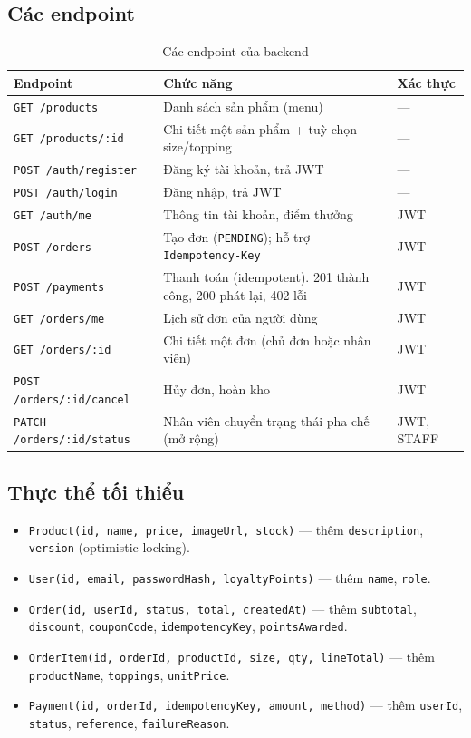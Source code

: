 \documentclass[a4paper]{article}
\newcommand{\st}[1]{\texttt{#1}}
\begin{document}
\subsection{Các endpoint}
\begin{table}[h!]
\centering\small
\begin{tabularx}{\textwidth}{|L{4.1cm}|X|L{1.8cm}|}
\hline
\textbf{Endpoint} & \textbf{Chức năng} & \textbf{Xác thực} \\ \hline
\texttt{GET /products} & Danh sách sản phẩm (menu) & --- \\ \hline
\texttt{GET /products/:id} & Chi tiết một sản phẩm + tuỳ chọn size/topping & --- \\ \hline
\texttt{POST /auth/register} & Đăng ký tài khoản, trả JWT & --- \\ \hline
\texttt{POST /auth/login} & Đăng nhập, trả JWT & --- \\ \hline
\texttt{GET /auth/me} & Thông tin tài khoản, điểm thưởng & JWT \\ \hline
\texttt{POST /orders} & Tạo đơn (\st{PENDING}); hỗ trợ \texttt{Idempotency-Key} & JWT \\ \hline
\texttt{POST /payments} & Thanh toán (idempotent). 201 thành công, 200 phát lại, 402 lỗi & JWT \\ \hline
\texttt{GET /orders/me} & Lịch sử đơn của người dùng & JWT \\ \hline
\texttt{GET /orders/:id} & Chi tiết một đơn (chủ đơn hoặc nhân viên) & JWT \\ \hline
\texttt{POST /orders/:id/cancel} & Hủy đơn, hoàn kho & JWT \\ \hline
\texttt{PATCH /orders/:id/status} & Nhân viên chuyển trạng thái pha chế (mở rộng) & JWT, STAFF \\ \hline
\end{tabularx}
\caption{Các endpoint của backend}
\end{table}

\subsection{Thực thể tối thiểu}
\begin{itemize}
  \item \texttt{Product(id, name, price, imageUrl, stock)} --- thêm \texttt{description}, \texttt{version} (optimistic locking).
  \item \texttt{User(id, email, passwordHash, loyaltyPoints)} --- thêm \texttt{name}, \texttt{role}.
  \item \texttt{Order(id, userId, status, total, createdAt)} --- thêm \texttt{subtotal},\allowbreak{} \texttt{discount},\allowbreak{} \texttt{couponCode},\allowbreak{} \texttt{idempotencyKey},\allowbreak{} \texttt{pointsAwarded}.
  \item \texttt{OrderItem(id, orderId, productId, size, qty, lineTotal)} --- thêm \texttt{productName}, \texttt{toppings}, \texttt{unitPrice}.
  \item \texttt{Payment(id, orderId, idempotencyKey, amount, method)} --- thêm \texttt{userId}, \texttt{status}, \texttt{reference}, \texttt{failureReason}.
\end{itemize}
\end{document}
